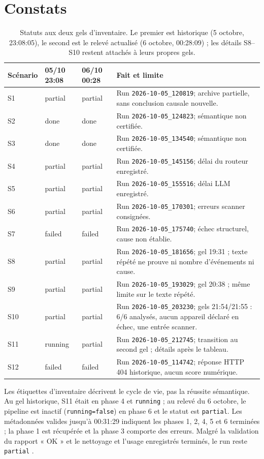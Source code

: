 \documentclass[11pt,a4paper]{article}
\newcommand{\code}[1]{{\urlstyle{tt}\nolinkurl{#1}}}
\begin{document}
\section{Constats}
\begin{table}[ht]
\centering\small
\caption{Statuts aux deux gels d'inventaire. Le premier est historique (5 octobre, 23:08:05), le second est le relevé actualisé (6 octobre, 00:28:09) ; les détails S8–S10 restent attachés à leurs propres gels.}\label{tab:run2}
\begin{tabularx}{\linewidth}{@{}l l l Y@{}}\toprule
Scénario & 05/10 23:08 & 06/10 00:28 & Fait et limite \\\midrule
S1 & partial & partial & Run \code{2026-10-05_120819}; archive partielle, sans conclusion causale nouvelle.\\
S2 & done & done & Run \code{2026-10-05_124823}; sémantique non certifiée.\\
S3 & done & done & Run \code{2026-10-05_134540}; sémantique non certifiée.\\
S4 & partial & partial & Run \code{2026-10-05_145156}; délai du routeur enregistré.\\
S5 & partial & partial & Run \code{2026-10-05_155516}; délai LLM enregistré.\\
S6 & partial & partial & Run \code{2026-10-05_170301}; erreurs scanner consignées.\\
S7 & failed & failed & Run \code{2026-10-05_175740}; échec structurel, cause non établie.\\
S8 & partial & partial & Run \code{2026-10-05_181656}; gel 19:31 ; texte répété ne prouve ni nombre d'événements ni cause.\\
S9 & partial & partial & Run \code{2026-10-05_193029}; gel 20:38 ; même limite sur le texte répété.\\
S10 & partial & partial & Run \code{2026-10-05_203230}; gels 21:54/21:55 : 6/6 analysés, aucun appareil déclaré en échec, une entrée scanner.\\
S11 & running & partial & Run \code{2026-10-05_212745}; transition au second gel ; détails après le tableau.\\
S12 & failed & failed & Run \code{2026-10-05_114742}; réponse HTTP 404 historique, aucun score numérique.\\
\bottomrule\end{tabularx}
\end{table}

Les étiquettes d'inventaire décrivent le cycle de vie, pas la réussite sémantique. Au gel historique, S11 était en phase 4 et \code{running} ; au relevé du 6 octobre, le pipeline est inactif (\code{running=false}) en phase 6 et le statut est \code{partial}. Les métadonnées valides jusqu'à 00:31:29 indiquent les phases 1, 2, 4, 5 et 6 terminées ; la phase 1 est récupérée et la phase 3 comporte des erreurs. Malgré la validation du rapport « OK » et le nettoyage et l'usage enregistrés terminés, le run reste \code{partial} \cite{inv,snapshots,inv6}.
\end{document}
